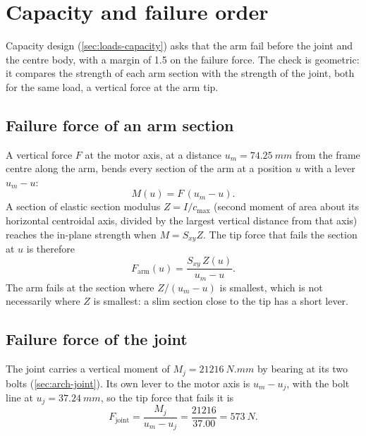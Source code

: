 \section{Capacity and failure order}\label{sec:capacity}\label{sec:strength-capacity}

Capacity design (\cref{sec:loads-capacity}) asks that the arm fail before the joint and the centre body, with a margin of 1.5 on the failure force. The check is geometric: it compares the strength of each arm section with the strength of the joint, both for the same load, a vertical force at the arm tip.

\subsection{Failure force of an arm section}

A vertical force $F$ at the motor axis, at a distance $u_m = \SI{74.25}{mm}$ from the frame centre along the arm, bends every section of the arm at a position $u$ with a lever $u_m - u$:
\begin{equation}
M(u) = F\,(u_m - u).
\end{equation}
A section of elastic section modulus $Z = I/c_\text{max}$ (second moment of area about its horizontal centroidal axis, divided by the largest vertical distance from that axis) reaches the in-plane strength when $M = S_{xy} Z$. The tip force that fails the section at $u$ is therefore
\begin{equation}
F_\text{arm}(u) = \frac{S_{xy}\, Z(u)}{u_m - u}.
\end{equation}
The arm fails at the section where $Z/(u_m - u)$ is smallest, which is not necessarily where $Z$ is smallest: a slim section close to the tip has a short lever.

\subsection{Failure force of the joint}

The joint carries a vertical moment of $M_j = \SI{21216}{N.mm}$ by bearing at its two bolts (\cref{sec:arch-joint}). Its own lever to the motor axis is $u_m - u_j$, with the bolt line at $u_j = \SI{37.24}{mm}$, so the tip force that fails it is
\begin{equation}
F_\text{joint} = \frac{M_j}{u_m - u_j} = \frac{21216}{37.00} = \SI{573}{N}.
\end{equation}

